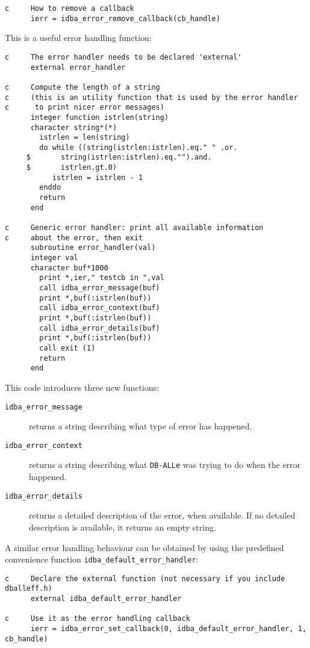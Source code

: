 \documentclass[final,12pt,a4paper,twoside]{book}
\newcommand{\dballe}{{\tt DB-ALLe}}
\begin{document}
\begin{verbatim}
c     How to remove a callback
      ierr = idba_error_remove_callback(cb_handle)
\end{verbatim}

This is a useful error handling function:

\begin{verbatim}
c     The error handler needs to be declared 'external'
      external error_handler

c     Compute the length of a string
c     (this is an utility function that is used by the error handler
c      to print nicer error messages)
      integer function istrlen(string)
      character string*(*)
        istrlen = len(string)
        do while ((string(istrlen:istrlen).eq." " .or.
     $       string(istrlen:istrlen).eq."").and.
     $       istrlen.gt.0)
           istrlen = istrlen - 1
        enddo
        return
      end

c     Generic error handler: print all available information
c     about the error, then exit
      subroutine error_handler(val)
      integer val
      character buf*1000
        print *,ier," testcb in ",val
        call idba_error_message(buf)
        print *,buf(:istrlen(buf))
        call idba_error_context(buf)
        print *,buf(:istrlen(buf))
        call idba_error_details(buf)
        print *,buf(:istrlen(buf))
        call exit (1)
        return
      end
\end{verbatim}

This code introduces three new functions:

\begin{description}
\item[{\tt idba\_error\_message}]
  returns a string describing what type of error has happened.
\item[{\tt idba\_error\_context}]
  returns a string describing what \dballe{} was trying to do when the error
  happened.
\item[{\tt idba\_error\_details}]
  returns a detailed description of the error, when available.  If no detailed
  description is available, it returns an empty string.
\end{description}

A similar error handling behaviour can be obtained by using the predefined
convenience function {\tt idba\_default\_error\_handler}:

\label{fun-error-handler}

\begin{verbatim}
c     Declare the external function (not necessary if you include dballeff.h)
      external idba_default_error_handler

c     Use it as the error handling callback
      ierr = idba_error_set_callback(0, idba_default_error_handler, 1, cb_handle)
\end{verbatim}
\end{document}
